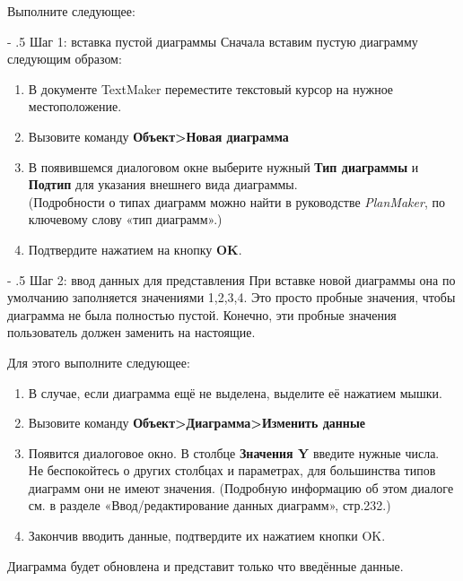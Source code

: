 \documentclass[a4paper,10pt]{article}
\makeatletter
\renewcommand\paragraph{%
   \@startsection{paragraph}{4}{0mm}%
      {-\baselineskip}%
      {.5\baselineskip}%
      {\normalfont\normalsize\bfseries}}
\makeatother
\begin{document}
 Выполните следующее:
 
 \paragraph{Шаг 1: вставка пустой диаграммы}
 Сначала вставим пустую диаграмму следующим образом:
 \begin{enumerate}
  \item В документе TextMaker переместите текстовый курсор на нужное местоположение.
  \item Вызовите команду \textbf{Объект>Новая диаграмма}
  \item В появившемся диалоговом окне выберите нужный \textbf{Тип диаграммы} и \textbf{Подтип} для указания внешнего вида диаграммы.\\
  (Подробности о типах диаграмм можно найти в руководстве \textit{PlanMaker}, по ключевому слову «тип диаграмм».)
  \item Подтвердите нажатием на кнопку \textbf{OK}.
 \end{enumerate}

 \paragraph{Шаг 2: ввод данных для представления}
 При вставке новой диаграммы она по умолчанию заполняется значениями 1,2,3,4. Это просто пробные значения, чтобы диаграмма не была полностью пустой. Конечно, эти пробные значения пользователь должен заменить на настоящие.
 
 Для этого выполните следующее:
 
 \begin{enumerate}
  \item В случае, если диаграмма ещё не выделена, выделите её нажатием мышки.
  \item Вызовите команду \textbf{Объект>Диаграмма>Изменить данные}
  \item Появится диалоговое окно. В столбце \textbf{Значения Y} введите нужные числа.\\
  Не беспокойтесь о других столбцах и параметрах, для большинства типов диаграмм они не имеют значения. (Подробную информацию об этом диалоге см. в разделе «Ввод/редактирование данных диаграмм», стр.232.)
  \item Закончив вводить данные, подтвердите их нажатием кнопки OK.
 \end{enumerate}

 Диаграмма будет обновлена и представит только что введённые данные.
 
\end{document}
